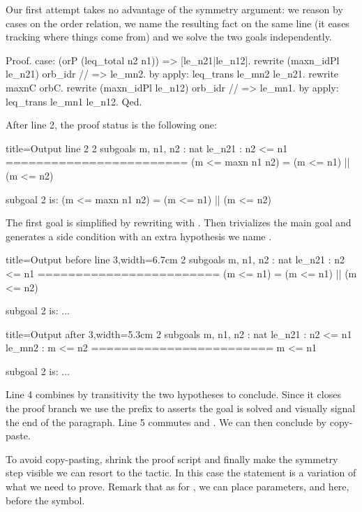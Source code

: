 Our first attempt takes no advantage of the symmetry argument:
we reason by cases on the order relation,
we name the resulting fact on the same line
(it eases tracking where things come from) and we solve the two
goals independently.

\begin{coq}{}{}
Proof.
case: (orP (leq_total n2 n1)) => [le_n21|le_n12].
  rewrite (maxn_idPl le_n21) orb_idr // => le_mn2.
  by apply: leq_trans le_mn2 le_n21.
rewrite maxnC orbC.
rewrite (maxn_idPl le_n12) orb_idr // => le_mn1.
by apply: leq_trans le_mn1 le_n12.
Qed.
\end{coq}

After line 2, the proof status is the following one:

\begin{coqout}{}{title=Output line 2}
2 subgoals
m, n1, n2 : nat
le_n21 : n2 <= n1
========================
(m <= maxn n1 n2) = (m <= n1) || (m <= n2)

subgoal 2 is:
(m <= maxn n1 n2) = (m <= n1) || (m <= n2)
\end{coqout}

The first goal is simplified by
rewriting with . %
Then  trivializes the main goal and generates a side condition with
an extra hypothesis we name .

\begin{coqout}{}{title=Output before line 3,width=6.7cm}
2 subgoals
m, n1, n2 : nat
le_n21 : n2 <= n1
========================
(m <= n1) = (m <= n1) || (m <= n2)

subgoal 2 is: ...
\end{coqout}
\begin{coqout}{}{title=Output after 3,width=5.3cm}
2 subgoals
m, n1, n2 : nat
le_n21 : n2 <= n1
le_mn2 : m <= n2
========================
m <= n1

subgoal 2 is: ...
\end{coqout}

Line 4 combines by transitivity the two hypotheses to conclude.  Since it closes the
proof branch we use the prefix  to asserts the goal is solved and
visually signal the end of the paragraph.  Line 5 commutes  and \C{||}.
We can then conclude by copy-paste.


To avoid copy-pasting, shrink the proof script and finally make the
symmetry step visible we can resort to the  tactic.
In this case the statement is a variation of what we need to prove.
Remark that as for , we can place parameters,  and 
here, before the \C{:} symbol.

